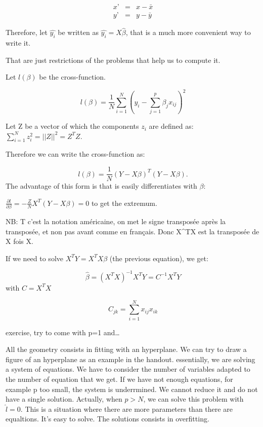 \documentclass[a4paper]{tufte-book}
\begin{document}
{\begin{eqnarray}
x’&=& x-\bar{x}\\
y’&=& y-\bar{y}
\end{eqnarray}

Therefore, let $\hat{y_i}$ be written as $\hat{y_i} = X \hat{\beta}$, that is a much more convenient way to write it.

That are just restrictions of the problems that help us to compute it.

Let $l(\beta)$ be the cross-function.

\begin{equation}
l(\beta) = \frac{1}{N} \sum_{i=1}^N \left( y_i - \sum_{j=1}^p \beta_j x_{ij} \right)^2
\end{equation}

Let Z be a vector of which the components $z_i$ are defined as: $\sum_{i=1}^N z_i^2 = ||Z||^2 = Z^TZ.$

Therefore we can write the cross-function as:

\begin{equation}
l(\beta) = \frac{1}{N} (Y-X\beta)^T(Y-X\beta).
\end{equation}
The advantage of this form is that is easily differentiates with $\beta$:

$\frac{\partial l}{\partial \beta} =  -\frac{Z}{N} X^T(Y-X\beta) =0$ to get the extremum.

NB: T c’est la notation américaine, on met le signe transposée après la transposée, et non pas avant comme en français. Donc X^TX est la transposée de X fois X.

If we need to solve $X^TY = X^TX\beta$ (the previous equation), we get:

\begin{equation}
\hat{\beta} = (X^TX)^{-1} X^TY = C^{-1} X^TY
\end{equation}
with $C = X^TX$

\begin{equation}
C_{jk} = \sum_{i=1}^N x_{ij} x_{ik}
\end{equation}

exercise, try to come with p=1 and…

All the geometry consists in fitting with an hyperplane. We can try to draw a figure of an hyperplane as an example in the handout.
essentially, we are solving a system of equations. We have to consider the number of variables adapted to the number of equation that we get. If we have not enough equations, for example p too small, the system is underrmined. We cannot reduce it and do not have a single solution.
Actually, when $p>N$, we can solve this problem with $\hat{l}=0$. This is a situation where there are more parameters than there are equaltions. It’s easy to solve. The solutions consists in overfitting.

}
\end{document}
